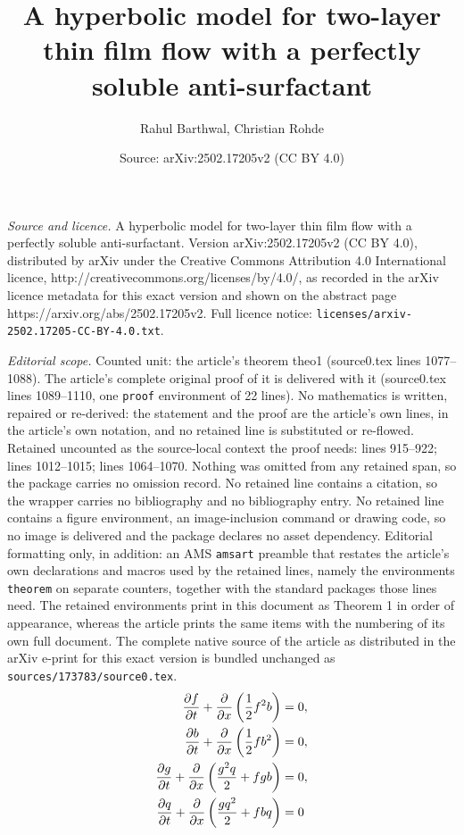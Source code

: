 \documentclass[10pt,a4paper]{amsart}
\title{A hyperbolic model for two-layer thin film flow with a perfectly soluble anti-surfactant}
\author{Rahul Barthwal, Christian Rohde}
\date{Source: arXiv:2502.17205v2 (CC BY 4.0)}
\begin{document}
\maketitle

\noindent\emph{Source and licence.} A hyperbolic model for two-layer thin film flow with a perfectly soluble anti-surfactant. Version arXiv:2502.17205v2 (CC BY 4.0), distributed by arXiv under the Creative Commons Attribution 4.0 International licence, http://creativecommons.org/licenses/by/4.0/, as recorded in the arXiv licence metadata for this exact version and shown on the abstract page https://arxiv.org/abs/2502.17205v2. Full licence notice: \texttt{licenses/arxiv-2502.17205-CC-BY-4.0.txt}.\par\smallskip

\noindent\textit{Editorial scope.} Counted unit: the article's theorem theo1 (source0.tex lines 1077--1088). The article's complete original proof of it is delivered with it (source0.tex lines 1089--1110, one \texttt{proof} environment of 22 lines). No mathematics is written, repaired or re-derived: the statement and the proof are the article's own lines, in the article's own notation, and no retained line is substituted or re-flowed.  Retained uncounted as the source-local context the proof needs: lines 915--922; lines 1012--1015; lines 1064--1070.  Nothing was omitted from any retained span, so the package carries no omission record.  No retained line contains a citation, so the wrapper carries no bibliography and no bibliography entry.  No retained line contains a figure environment, an image-inclusion command or drawing code, so no image is delivered and the package declares no asset dependency.  Editorial formatting only, in addition: an AMS \texttt{amsart} preamble that restates the article's own declarations and macros used by the retained lines, namely the environments \texttt{theorem} on separate counters, together with the standard packages those lines need.  The retained environments print in this document as Theorem 1 in order of appearance, whereas the article prints the same items with the numbering of its own full document.  The complete native source of the article as distributed in the arXiv e-print for this exact version is bundled unchanged as \texttt{sources/173783/source0.tex}.
\begin{align}\label{eq: Main_system}
    \dfrac{\partial f}{\partial t}+\dfrac{\partial}{\partial x}\left(\dfrac{1}{2}f^2b\right)&=0,\vspace{0.2 cm} \nonumber\\
    \dfrac{\partial b}{\partial t}+\dfrac{\partial}{\partial x}\left(\dfrac{1}{2}fb^2\right)&=0,\vspace{0.2 cm} \\
     \dfrac{\partial g}{\partial t}+\dfrac{\partial}{\partial x}\left(\dfrac{g^2q}{2}+fgb\right)&=0,\vspace{0.2 cm} \nonumber\\
  \dfrac{\partial q}{\partial t}+\dfrac{\partial}{\partial x}\left(\dfrac{gq^2}{2}+fbq\right)&=0\nonumber
\end{align}
\end{document}
